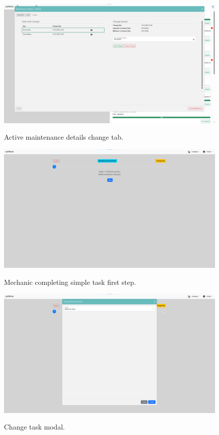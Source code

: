 \begin{figure}[htbp]
  \caption{Active maintenance details change tab.}
  \centering
  \includegraphics[width=\textwidth]{figs/Implementation/rececionist/maintenance_details_change}
  \label{fig:impReceMaintChange}
\end{figure}




\begin{figure}[htbp]
  \caption{Mechanic completing simple task first step.}
  \centering
  \includegraphics[width=\textwidth]{figs/Implementation/mechanic/MechanicTaskNormal}
  \label{fig:MechanicTaskNormal}
\end{figure}



\begin{figure}[htbp]
  \caption{Change task modal.}
  \centering
  \includegraphics[width=\textwidth]{figs/Implementation/mechanic/MechanicTaskChangeTask}
  \label{fig:MechanicTaskChangeTask}
\end{figure}



